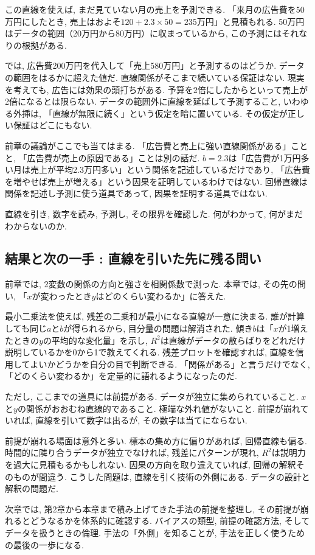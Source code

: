この直線を使えば, まだ見ていない月の売上を予測できる.
「来月の広告費を50万円にしたとき, 売上はおよそ$120 + 2.3 \times 50 = 235$万円」と見積もれる.
50万円はデータの範囲（20万円から80万円）に収まっているから, この予測にはそれなりの根拠がある.

では, 広告費200万円を代入して「売上580万円」と予測するのはどうか.
データの範囲をはるかに超えた値だ.
直線関係がそこまで続いている保証はない.
現実を考えても, 広告には効果の頭打ちがある.
予算を2倍にしたからといって売上が2倍になるとは限らない.
データの範囲外に直線を延ばして予測すること, いわゆる外挿は, 「直線が無限に続く」という仮定を暗に置いている.
その仮定が正しい保証はどこにもない.

前章の議論がここでも当てはまる.
「広告費と売上に強い直線関係がある」ことと, 「広告費が売上の原因である」ことは別の話だ.
$b = 2.3$は「広告費が1万円多い月は売上が平均2.3万円多い」という関係を記述しているだけであり, 「広告費を増やせば売上が増える」という因果を証明しているわけではない.
回帰直線は関係を記述し予測に使う道具であって, 因果を証明する道具ではない.

直線を引き, 数字を読み, 予測し, その限界を確認した.
何がわかって, 何がまだわからないのか.


\subsection{結果と次の一手 : 直線を引いた先に残る問い}

前章では, 2変数の関係の方向と強さを相関係数で測った.
本章では, その先の問い, 「$x$が変わったとき$y$はどのくらい変わるか」に答えた.

最小二乗法を使えば, 残差の二乗和が最小になる直線が一意に決まる.
誰が計算しても同じ$a$と$b$が得られるから, 目分量の問題は解消された.
傾き$b$は「$x$が1増えたときの$y$の平均的な変化量」を示し, $R^2$は直線がデータの散らばりをどれだけ説明しているかを0から1で教えてくれる.
残差プロットを確認すれば, 直線を信用してよいかどうかを自分の目で判断できる.
「関係がある」と言うだけでなく, 「どのくらい変わるか」を定量的に語れるようになったのだ.

ただし, ここまでの道具には前提がある.
データが独立に集められていること.
$x$と$y$の関係がおおむね直線的であること.
極端な外れ値がないこと.
前提が崩れていれば, 直線を引いて数字は出るが, その数字は当てにならない.

前提が崩れる場面は意外と多い.
標本の集め方に偏りがあれば, 回帰直線も偏る.
時間的に隣り合うデータが独立でなければ, 残差にパターンが現れ, $R^2$は説明力を過大に見積もるかもしれない.
因果の方向を取り違えていれば, 回帰の解釈そのものが間違う.
こうした問題は, 直線を引く技術の外側にある.
データの設計と解釈の問題だ.

次章では, 第2章から本章まで積み上げてきた手法の前提を整理し, その前提が崩れるとどうなるかを体系的に確認する.
バイアスの類型, 前提の確認方法, そしてデータを扱うときの倫理.
手法の「外側」を知ることが, 手法を正しく使うための最後の一歩になる.
